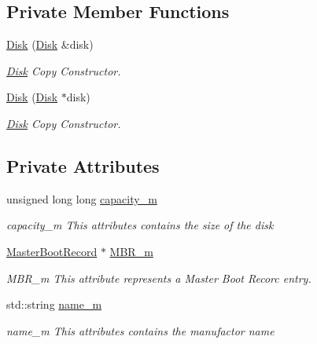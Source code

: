 \subsection*{Private Member Functions}
\begin{DoxyCompactItemize}
\item 
\mbox{\hyperlink{classcore_1_1disk_1_1_disk_ad1fec93b14401a2496053fee61ec093e}{Disk}} (\mbox{\hyperlink{classcore_1_1disk_1_1_disk}{Disk}} \&disk)
\begin{DoxyCompactList}\small\item\em \mbox{\hyperlink{classcore_1_1disk_1_1_disk}{Disk}} Copy Constructor. \end{DoxyCompactList}\item 
\mbox{\hyperlink{classcore_1_1disk_1_1_disk_a2c193c2ef0c575fe9ffa77eb2f7cf5ef}{Disk}} (\mbox{\hyperlink{classcore_1_1disk_1_1_disk}{Disk}} $\ast$disk)
\begin{DoxyCompactList}\small\item\em \mbox{\hyperlink{classcore_1_1disk_1_1_disk}{Disk}} Copy Constructor. \end{DoxyCompactList}\end{DoxyCompactItemize}
\subsection*{Private Attributes}
\begin{DoxyCompactItemize}
\item 
\mbox{\label{classcore_1_1disk_1_1_disk_a318813d090c1ea19e8cbd71d275906c6}} 
unsigned long long \mbox{\hyperlink{classcore_1_1disk_1_1_disk_a318813d090c1ea19e8cbd71d275906c6}{capacity\+\_\+m}}
\begin{DoxyCompactList}\small\item\em capacity\+\_\+m This attributes contains the size of the disk \end{DoxyCompactList}\item 
\mbox{\label{classcore_1_1disk_1_1_disk_a20569196ce0a16f1fe04e8065cb5e233}} 
\mbox{\hyperlink{classcore_1_1disk_1_1_master_boot_record}{Master\+Boot\+Record}} $\ast$ \mbox{\hyperlink{classcore_1_1disk_1_1_disk_a20569196ce0a16f1fe04e8065cb5e233}{M\+B\+R\+\_\+m}}
\begin{DoxyCompactList}\small\item\em M\+B\+R\+\_\+m This attribute represents a Master Boot Recorc entry. \end{DoxyCompactList}\item 
\mbox{\label{classcore_1_1disk_1_1_disk_a9669787c8b3049213956af71a99edf7b}} 
std\+::string \mbox{\hyperlink{classcore_1_1disk_1_1_disk_a9669787c8b3049213956af71a99edf7b}{name\+\_\+m}}
\begin{DoxyCompactList}\small\item\em name\+\_\+m This attributes contains the manufactor name \end{DoxyCompactList}\end{DoxyCompactItemize}
